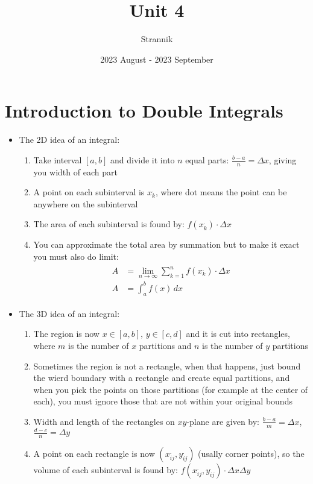\documentclass{article}
\title{Unit 4}
\author{Strannik}
\date{2023 August - 2023 September}
\begin{document}
\maketitle
\section{Introduction to Double Integrals}
\begin{itemize}
  \item The 2D idea of an integral:
  \begin{enumerate}
    \item Take interval $[a,b]$ and divide it into $n$ equal parts: $\frac{b - a}{n} = \Delta x$, giving you width of each part
    \item A point on each subinterval is $x_k^{.}$, where dot means the point can be anywhere on the subinterval
    \item The area of each subinterval is found by: $f(x_k^{.})\cdot\Delta x$
    \item You can approximate the total area by summation but to make it exact you must also do limit:
    \begin{align}
      \begin{split}
        A &= \lim_{n \to \infty} \sum_{k = 1}^{n} f(x_k^{.})\cdot\Delta x \\
        A &= \int_{a}^{b} f(x) \, dx
      \end{split}
    \end{align}
  \end{enumerate}
  \item The 3D idea of an integral:
  \begin{enumerate}
    \item The region is now $x \in [a,b], \, y \in [c,d]$ and it is cut into rectangles, where $m$ is the number of $x$ partitions and $n$ is the number of $y$ partitions
    \item Sometimes the region is not a rectangle, when that happens, just bound the wierd boundary with a rectangle and create equal partitions, and when you pick the points on those partitions (for example at the center of each), you must ignore those that are not within your original bounds
    \item Width and length of the rectangles on $xy$-plane are given by: $\frac{b - a}{m} = \Delta x$, $\frac{d - c}{n} = \Delta y$
    \item A point on each rectangle is now $(x_{ij}^{.}, y_{ij}^{.})$ (usally corner points), so the volume of each subinterval is found by: $f(x_{ij}^{.}, y_{ij}^{.})\cdot\Delta x \Delta y$

\end{enumerate}
\end{itemize}
\end{document}
